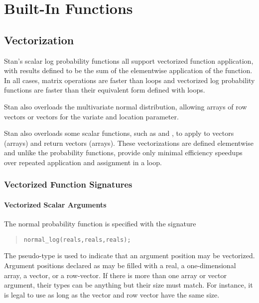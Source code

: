 \part{Built-In Functions}\label{built-in-functions.part}


\chapter{Vectorization}\label{vectorization.chapter}

\noindent
Stan's scalar log probability functions all support vectorized
function application, with results defined to be the sum of the
elementwise application of the function.  In all cases, matrix
operations are faster than loops and vectorized log probability
functions are faster than their equivalent form defined with loops.

Stan also overloads the multivariate normal distribution, allowing
arrays of row vectors or vectors for the variate and location
parameter.

Stan also overloads some scalar functions, such as  and
, to apply to vectors (arrays) and return vectors (arrays).  
These vectorizations are defined elementwise and unlike the
probability functions, provide only minimal efficiency speedups over
repeated application and assignment in a loop.


\section{Vectorized Function Signatures}\label{prob-vectorization.section}

\subsection{Vectorized Scalar Arguments}

The normal probability function is specified with the signature
%
\begin{quote}
\begin{Verbatim}
normal_log(reals,reals,reals);
\end{Verbatim}
\end{quote}
%
The pseudo-type  is used to indicate that an argument
position may be vectorized.  Argument positions declared as
 may be filled with a real, a one-dimensional array, a
vector, or a row-vector.  If there is more than one array or vector
argument, their types can be anything but their size must match.  For
instance, it is legal to use
 as long as the vector and
row vector have the same size.  

